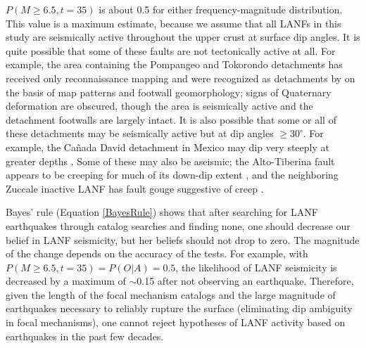 \documentclass[twocolumn,grl]{AGUTeX}
\begin{document}
\begin{article}
$P(M\ge6.5, t=35)$ is about 0.5 for either frequency-magnitude distribution.
This value is a maximum estimate, because we assume that all LANFs in this
study are seismically active throughout the upper crust at surface dip angles.
It is quite possible that some of these faults are not tectonically active
at all. For example, the area containing the Pompangeo and Tokorondo
detachments has received only reconnaissance mapping
\citep{parkinson1998sulawesi} and were recognized as detachments by
\citet{spencer2011} on the basis of map patterns and footwall geomorphology;
signs of Quaternary deformation are obscured, though the area is seismically
active and the detachment footwalls are largely intact.
It is also possible that some or all of these detachments may be seismically
active but at dip angles $\ge30^\circ$.  For example, the Ca\~nada David
detachment in Mexico may dip very steeply at greater depths 
\citep{fletcherspelz2009}.
Some of these may also be aseismic; the Alto-Tiberina fault appears to
be creeping for much of its down-dip extent
\citep{hreinsdottir2009altotib}, and the neighboring Zuccale inactive
LANF has fault gouge suggestive of creep  \citep{collettiniholdsworth2004}.


Bayes' rule (Equation \ref{BayesRule}) shows that after searching for LANF 
earthquakes through catalog searches and finding none, one should decrease
our belief in LANF seismicity, but her beliefs should not drop to zero.  The
magnitude of the change depends on the accuracy of the tests. For example,
with $P(M\ge6.5, t=35) = P(O|A) = 0.5$, the likelihood of LANF seismicity
is decreased by a maximum of $\sim$0.15 after not observing an earthquake.
Therefore, given the length of the focal mechanism catalogs and the large
magnitude of earthquakes necessary to reliably rupture the surface
(eliminating dip ambiguity in focal mechanisms), one cannot reject hypotheses
of LANF activity based on earthquakes in the past few decades.



\end{article}
\end{document}
